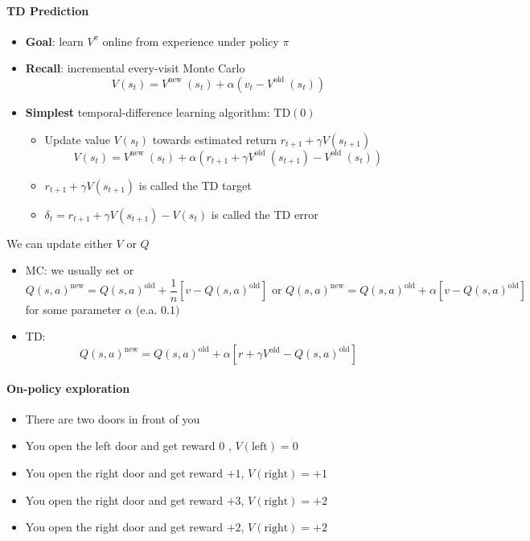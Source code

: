 \paragraph{TD Prediction}
\begin{itemize}
    \item \textbf{Goal}: learn $V^{\pi}$ online from experience under policy $\pi$
    \item \textbf{Recall}: incremental every-visit Monte Carlo
    \[
    V\left(s_{t}\right)=V^{\text {new }}\left(s_{t}\right)+\alpha\left(v_{t}-V^{\text {old }}\left(s_{t}\right)\right)
    \]
    \item \textbf{Simplest} temporal-difference learning algorithm: $\mathrm{TD}(0)$
    \begin{itemize}
        \item Update value $V\left(s_{t}\right)$ towards estimated return $r_{t+1}+\gamma V\left(s_{t+1}\right)$
        \[
        V\left(s_{t}\right)=V^{\text {new }}\left(s_{t}\right)+\alpha\left(r_{t+1}+\gamma V^{\text {old }}\left(s_{t+1}\right)-V^{\text {old }}\left(s_{t}\right)\right)
        \]
        \item $r_{t+1}+\gamma V\left(s_{t+1}\right)$ is called the TD target
        \item $\delta_{t}=r_{t+1}+\gamma V\left(s_{t+1}\right)-V\left(s_{t}\right)$ is called the TD error
    \end{itemize}
\end{itemize}

We can update either $V$ or $Q$

\begin{itemize}
    \item MC: we usually set
    or
    \[
    Q(s, a)^{\text{new}}=Q(s, a)^{\text{old}}+\frac{1}{n}\left[v-Q(s, a)^{\text{old}}\right] \text{ or } Q(s, a)^{\text{new}}=Q(s, a)^{\text{old}}+\alpha\left[v-Q(s, a)^{\text{old}}\right]
    \]
    for some parameter $\alpha$ (e.a. $0.1)$
    \item TD:
\[
Q(s, a)^{\text{new}}=Q(s, a)^{\text{old}}+\alpha\left[r+\gamma V^{\text{old}}-Q(s, a)^{\text{old}}\right]
\]
\end{itemize}

\paragraph{On-policy exploration}
\begin{itemize}
    \item There are two doors in front of you
    \item You open the left door and get reward 0 , $V(\text{left})=0$
    \item You open the right door and get reward $+1$, $V(\text{right})=+1$
    \item You open the right door and get reward $+3$, $V(\text{right})=+2$
    \item You open the right door and get reward $+2$, $V(\text{right})=+2$
\end{itemize}


